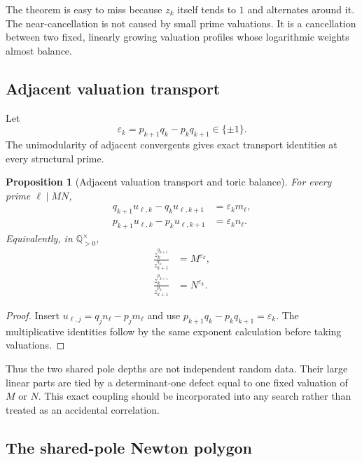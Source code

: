 \documentclass[11pt,oneside]{article}
\newtheorem{proposition}[theorem]{Proposition}
\theoremstyle{definition}
\theoremstyle{remark}
\newcommand{\Q}{\mathbb Q}
\begin{document}
The theorem is easy to miss because $z_k$ itself tends to $1$ and alternates around it.  The
near-cancellation is not caused by small prime valuations.  It is a cancellation between two
fixed, linearly growing valuation profiles whose logarithmic weights almost balance.

\subsection{Adjacent valuation transport}

Let
\begin{equation}
 \varepsilon_k=p_{k+1}q_k-p_kq_{k+1}\in\{\pm1\}.
 \label{eq:convergent-orientation}
\end{equation}
The unimodularity of adjacent convergents gives exact transport identities at every
structural prime.

\begin{proposition}[Adjacent valuation transport and toric balance]
\label{prop:adjacent-valuation-transport}
For every prime $\ell\mid MN$,
\begin{align}
 q_{k+1}u_{\ell,k}-q_ku_{\ell,k+1}&=\varepsilon_k m_\ell,
 \label{eq:q-valuation-transport}\\
 p_{k+1}u_{\ell,k}-p_ku_{\ell,k+1}&=\varepsilon_k n_\ell.
 \label{eq:p-valuation-transport}
\end{align}
Equivalently, in $\Q_{>0}^{\times}$,
\begin{align}
 \frac{z_k^{q_{k+1}}}{z_{k+1}^{q_k}}&=M^{\varepsilon_k},
 \label{eq:q-toric-balance}\\
 \frac{z_k^{p_{k+1}}}{z_{k+1}^{p_k}}&=N^{\varepsilon_k}.
 \label{eq:p-toric-balance}
\end{align}
\end{proposition}

\begin{proof}
Insert $u_{\ell,j}=q_jn_\ell-p_jm_\ell$ and use
$p_{k+1}q_k-p_kq_{k+1}=\varepsilon_k$.  The multiplicative identities follow by the same
exponent calculation before taking valuations.
\end{proof}

Thus the two shared pole depths are not independent random data.  Their large linear parts
are tied by a determinant-one defect equal to one fixed valuation of $M$ or $N$.  This exact
coupling should be incorporated into any search rather than treated as an accidental
correlation.

\subsection{The shared-pole Newton polygon}
\end{document}
